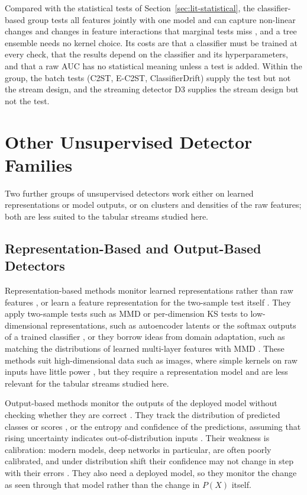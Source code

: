 Compared with the statistical tests of Section~\ref{sec:lit-statistical}, the classifier-based group tests all features jointly with one model and can capture non-linear changes and changes in feature interactions that marginal tests miss \citep{LopezPazOquab2017}, and a tree ensemble needs no kernel choice. Its costs are that a classifier must be trained at every check, that the results depend on the classifier and its hyperparameters, and that a raw AUC has no statistical meaning unless a test is added. Within the group, the batch tests (C2ST, E-C2ST, ClassifierDrift) supply the test but not the stream design, and the streaming detector D3 supplies the stream design but not the test.

\section{Other Unsupervised Detector Families}
\label{sec:lit-other-unsup}
Two further groups of unsupervised detectors work either on learned representations or model outputs, or on clusters and densities of the raw features; both are less suited to the tabular streams studied here.

\subsection{Representation-Based and Output-Based Detectors}
Representation-based methods monitor learned representations rather than raw features \citep{Rabanser2019}, or learn a feature representation for the two-sample test itself \citep{Liu2020}. They apply two-sample tests such as MMD or per-dimension KS tests to low-dimensional representations, such as autoencoder latents or the softmax outputs of a trained classifier \citep{Rabanser2019}, or they borrow ideas from domain adaptation, such as matching the distributions of learned multi-layer features with MMD \citep{Long2016}. These methods suit high-dimensional data such as images, where simple kernels on raw inputs have little power \citep{Liu2020}, but they require a representation model and are less relevant for the tabular streams studied here.

Output-based methods monitor the outputs of the deployed model without checking whether they are correct \citep{Sethi2017, Rabanser2019}. They track the distribution of predicted classes or scores \citep{Rabanser2019}, or the entropy and confidence of the predictions, assuming that rising uncertainty indicates out-of-distribution inputs \citep{Hendrycks2017}. Their weakness is calibration: modern models, deep networks in particular, are often poorly calibrated, and under distribution shift their confidence may not change in step with their errors \citep{Guo2017, Ovadia2019}. They also need a deployed model, so they monitor the change as seen through that model rather than the change in $P(X)$ itself.

